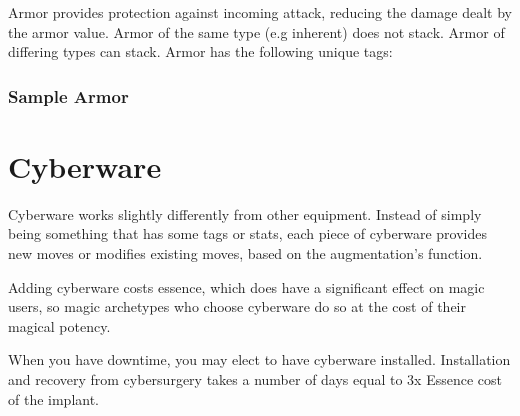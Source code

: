 Armor provides protection against incoming attack, reducing the damage dealt by the armor value. Armor of the same type (e.g inherent) does not stack. Armor of differing types can stack. Armor has the following unique tags:

\subsubsection{Sample Armor}


\section{Cyberware}

Cyberware works slightly differently from other equipment. Instead of simply being something that has some tags or stats, each piece of cyberware provides new moves or modifies existing moves, based on the augmentation’s function.

Adding cyberware costs essence, which does have a significant effect on magic users, so magic archetypes who choose cyberware do so at the cost of their magical potency.

When you have downtime, you may elect to have cyberware installed. Installation and recovery from cybersurgery takes a number of days equal to 3x Essence cost of the implant.

